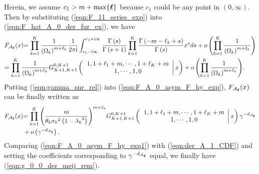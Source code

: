 \documentclass[12pt,onecolumn,draftcls]{IEEEtran}
\newcommand{\bs}{\boldsymbol}
\begin{document}
Herein, we assume $c_1>m+{\rm max}\{\bs{\ell}\}$ because $c_1 $ could be any point in $(0,\infty)$. Then by substituting (\ref{eqn:F_11_series_exp}) into (\ref{eqn:F_hat_A_0_der_fur_ex}), we have
\begin{align}\label{eqn:F_A_0_asym_F_hy_exp}
&{{F_{{{ {\cal A}}_{\bs{\ell}}}}}(x)}{ = \prod\limits_{k = 1}^K {\frac{1}{{{{\left( {{\Omega _k}} \right)}^{m+\ell_k}}}}} \frac{1}{{2\pi {\rm{i}}}}\int\nolimits_{{c_1} - {\rm{i}}\infty }^{{c_1} + {\rm{i}}\infty } {\frac{{\Gamma \left( s \right)}}{{\Gamma \left( {s + 1} \right)}}\prod\limits_{k = 1}^K {\frac{{\Gamma \left( { - m-\ell_k + s} \right)}}{{\Gamma \left( s \right)}}} {x^s}ds}  + o\left( {\prod\limits_{k = 1}^K {\frac{1}{{{{\left( {{\Omega _k}} \right)}^{m+\ell_k}}}}} } \right)} \notag\\
{}&{ = \prod\limits_{k = 1}^K {\frac{1}{{{{\left( {{\Omega _k}} \right)}^{m +\ell_k}}}}} G_{K + 1,K + 1}^{0,K + 1}\left( {\left. {\begin{array}{*{20}{c}}
{1,1 +\ell_1+ m , \cdots ,1 +\ell_K+ m}\\
{1, \cdots ,1,0}
\end{array}} \right|x} \right) + o\left( {\prod\limits_{k = 1}^K {\frac{1}{{{{\left( {{\Omega _k}} \right)}^{m+\ell_k }}}}} } \right)}.
\end{align}
Putting (\ref{eqn:gamma_snr_rel}) into (\ref{eqn:F_A_0_asym_F_hy_exp}), ${{F_{{{ {\cal A}}_{\bs{\ell}}}}}(x)}$ can be finally written as
\begin{align}\label{eqn:F_A_0_asym_F_hy_exp1}
{{F_{{{ {\cal A}}_{\bs{\ell}}}}}(x)}&{ = \prod\limits_{k = 1}^K {{{\left( {\frac{m}{{{\theta _k}{\sigma _k}^2\left( {1 - {\lambda _k}^2} \right)}}} \right)}^{m +\ell_k }}} G_{K + 1,K + 1}^{0,K + 1}\left( {\left. {\begin{array}{*{20}{c}}
{1,1 +\ell_1+ m, \cdots ,1 +\ell_K+m}\\
{1, \cdots ,1,0}
\end{array}} \right|x} \right){\gamma ^{-d_{{ {\cal A}_{\bs{\ell}}}}}} }\notag \\
&+ o\left( {{\gamma ^{-d_{{ {\cal A}_{\bs{\ell}}}}}}} \right).
\end{align}
Comparing (\ref{eqn:F_A_0_asym_F_hy_exp1}) with (\ref{eqn:der_A_1_CDF}) and setting the coefficients corresponding to ${\gamma ^{-d_{{ {\cal A}_{\bs{\ell}}}}}}$ equal, we finally have (\ref{eqn:g_0_0_der_meij_rem}).
\end{document}
